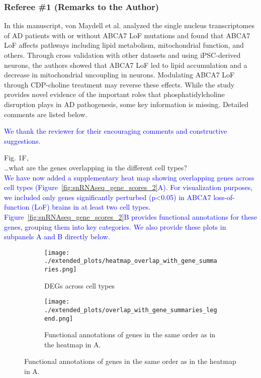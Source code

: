 \subsubsection*{Referee \#1 (Remarks to the Author)}
In this manuscript, von Maydell et al. analyzed the single nucleus transcriptomes of AD patients with or without ABCA7 LoF mutations and found that ABCA7 LoF affects pathways including lipid metabolism, mitochondrial function, and others. Through cross validation with other datasets and using iPSC-derived neurons, the authors showed that ABCA7 LoF led to lipid accumulation and a decrease in mitochondrial uncoupling in neurons. Modulating ABCA7 LoF through CDP-choline treatment may reverse these effects.
While the study provides novel evidence of the important roles that phosphatidylcholine disruption plays in AD pathogenesis, some key information is missing. Detailed comments are listed below.

\textcolor{blue}{We thank the reviewer for their encouraging comments and constructive suggestions.}

Fig. 1F,\\
\dots what are the genes overlapping in the different cell types?\\ 
\textcolor{blue}{ We have now added a supplementary heat map showing overlapping genes across cell types (Figure~\ref{fig:snRNAseq_gene_scores_2}A). For visualization purposes, we included only genes significantly perturbed (p<0.05) in ABCA7 loss-of-function (LoF) brains in at least two cell types. Figure~\ref{fig:snRNAseq_gene_scores_2}B provides functional annotations for these genes, grouping them into key categories. We also provide these plots in subpanels A and B directly below.}

\begin{figure}[H] 
    \begin{subfigure}[t]{0.2\textwidth}
        \caption{DEGs across cell types}
        \texttt{[image: ./extended\_plots/heatmap\_overlap\_with\_gene\_summaries.png]}        
    \end{subfigure}   
	\hspace{2cm}
    \begin{subfigure}[t]{0.8\textwidth}
        \caption{Functional annotations of genes in the same order as in the heatmap in A.}
        \vspace{.5cm}
        \texttt{[image: ./extended\_plots/overlap\_with\_gene\_summaries\_legend.png]}        
    \end{subfigure}   
\end{figure}


